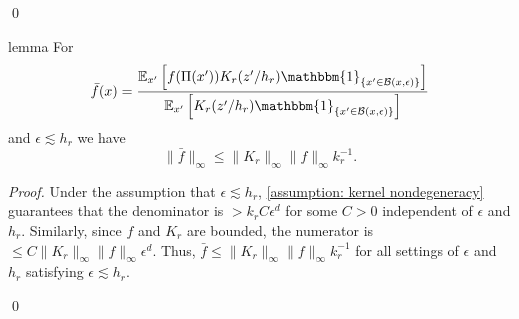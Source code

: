 \documentclass[11pt]{article}
\begin{document}
\qed{}


\begin{restatable}{lemma}{} \label{lemma: fbar bound}
    For 
    \[\bar{f}(x) = \frac{\mathbb{E}_{x'}\left[f(\Pi(x'))K_r(z'/h_r)\mathbbm{1}_{\{x'\in \mathcal{B}(x, \epsilon)\}}\right]}{\mathbb{E}_{x'}\left[K_r(z'/h_r)\mathbbm{1}_{\{x'\in \mathcal{B}(x, \epsilon)\}}\right]}\]
    and $\epsilon \lesssim h_r$ we have
    \begin{equation}
        \|\bar{f}\|_{\infty} \leq \|K_r\|_{\infty} \|f\|_{\infty}k_r^{-1}.
    \end{equation}
\end{restatable}
\noindent \textit{Proof.} Under the assumption that $\epsilon \lesssim h_r$, \cref{assumption: kernel nondegeneracy} guarantees that the denominator is  $> k_rC\epsilon^d$ for some $C > 0$ independent of $\epsilon$ and $h_r$. Similarly, since $f$ and $K_r$ are bounded, the numerator is $\leq C\|K_r\|_{\infty} \|f\|_{\infty} \epsilon^d$. Thus, $\bar{f} \leq \|K_r\|_{\infty} \|f\|_{\infty}k_r^{-1}$ for all settings of $\epsilon$ and $h_r$ satisfying $\epsilon \lesssim h_r$. 

\qed{}
\end{document}
